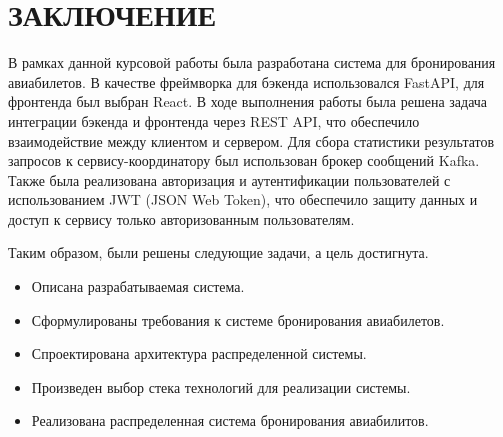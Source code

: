 \chapter*{\textbf{ЗАКЛЮЧЕНИЕ}}

В рамках данной курсовой работы была разработана система для бронирования авиабилетов. В качестве фреймворка для бэкенда использовался FastAPI, для фронтенда был выбран React. В ходе выполнения работы была решена задача интеграции бэкенда и фронтенда через REST API, что обеспечило взаимодействие между клиентом и сервером. Для сбора статистики результатов запросов к сервису-координатору был использован брокер сообщений Kafka. Также была реализована авторизация и аутентификации пользователей с использованием JWT (JSON Web Token), что обеспечило защиту данных и доступ к сервису только авторизованным пользователям.

Таким образом, были решены следующие задачи, а цель достигнута.
\begin{itemize}
  \item Описана разрабатываемая система.
  \item Сформулированы требования к системе бронирования авиабилетов.
  \item Спроектирована архитектура распределенной системы.
  \item Произведен выбор стека технологий для реализации системы.
  \item Реализована распределенная система бронирования авиабилитов.
\end{itemize}